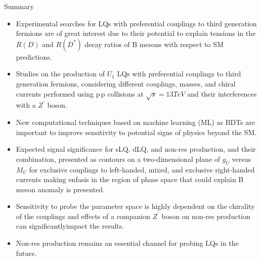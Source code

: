\documentclass{../bredelebeamer}
\begin{document}
\begin{frame}{Summary}
	\begin{itemize}
		\item Experimental searches for LQs with preferential couplings to third generation fermions are of great interest due to their potential to explain tensions in the $R(D)$ and $R(D^{*})$ decay ratios of B mesons with respect to SM predictions. \vfill
		
		\item Studies on the production of $U_1$ LQs with preferential couplings to third generation fermions, considering different couplings, masses, and chiral currents performed using $\mathrm{p}\,\mathrm{p}$ collisions at $\sqrt{s} = 13TeV$ and their interferences with a $Z^{\prime}$ boson.  \vfill
		
		\item New computational techniques based on machine learning (ML) as BDTs are important to improve sensitivity to potential signs of physics beyond the SM. \vfill
		
		\item Expected signal significance for sLQ, dLQ, and non-res production, and their combination, presented as contours on a two-dimensional plane of $g_U$ versus $M_U$ for exclusive couplings to left-handed, mixed, and exclusive right-handed currents making enfasis in the region of phase space that could explain B meson anomaly is presented. \vfill

		\item Sensitivity to probe the parameter space is highly dependent on the chirality of the couplings and effects of a companion $Z^{\prime}$ boson on non-res production can significantlyimpact the results. \vfill
		
		\item Non-res production remains an essential channel for probing LQs in the future. \vfill
	\end{itemize}
	
\end{frame}

	
\end{document}
